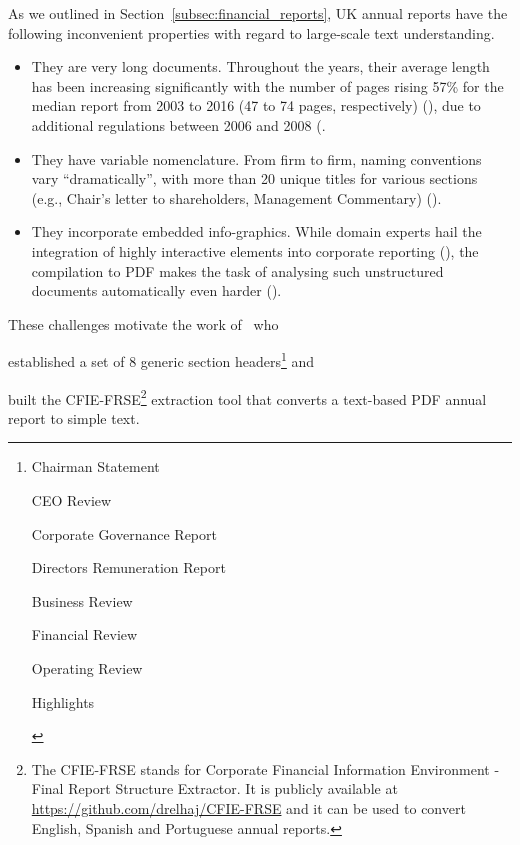 As we outlined in Section~\ref{subsec:financial_reports}, UK annual reports have the following inconvenient properties with regard to large-scale text understanding.
\begin{itemize}
    \item They are very long documents.
    Throughout the years, their average length has been increasing significantly with the number of pages rising 57\% for the median report from 2003 to 2016 (47 to 74 pages, respectively) (\cite{lewis_young_2019}), due to additional regulations between 2006 and 2008 (\cite{el-haj2019retrieving}.
    \item They have variable nomenclature.
    From firm to firm, naming conventions vary \enquote{dramatically}, with more than 20 unique titles for various sections (e.g., Chair's letter to shareholders, Management Commentary) (\cite{lewis_young_2019}).
    \item They incorporate embedded info-graphics.
    While domain experts hail the integration of highly interactive elements into corporate reporting (\cite{kriz2016future}), the compilation to PDF makes the task of analysing such unstructured documents automatically even harder (\cite{lewis_young_2019}).
\end{itemize}

These challenges motivate the work of~\cite{elhaj2019multilingual} who \begin{enumerate*}[label=(\alph*)]
    \item established a set of 8 generic section headers\footnote{
        \begin{enumerate*}
            \item Chairman Statement
            \item CEO Review
            \item Corporate Governance Report
            \item Directors Remuneration Report
            \item Business Review
            \item Financial Review
            \item Operating Review
            \item Highlights
        \end{enumerate*}
    } and
    \item built the CFIE-FRSE\footnote{
        The CFIE-FRSE stands for Corporate Financial Information Environment - Final Report Structure Extractor.
        It is publicly available at \url{https://github.com/drelhaj/CFIE-FRSE} and it can be used to convert English, Spanish and Portuguese annual reports.
    } extraction tool that converts a text-based PDF annual report to simple text.
\end{enumerate*}

